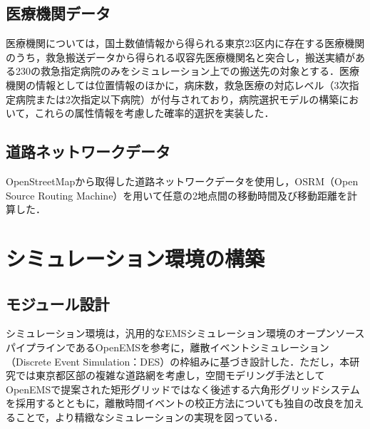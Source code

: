 \subsection{医療機関データ}
医療機関については，国土数値情報\cite{medical}から得られる東京23区内に存在する医療機関のうち，救急搬送データから得られる収容先医療機関名と突合し，搬送実績がある230の救急指定病院のみをシミュレーション上での搬送先の対象とする．医療機関の情報としては位置情報のほかに，病床数，救急医療の対応レベル（3次指定病院または2次指定以下病院）が付与されており，病院選択モデルの構築において，これらの属性情報を考慮した確率的選択を実装した．

\subsection{道路ネットワークデータ}
OpenStreetMap\cite{OSM}から取得した道路ネットワークデータを使用し，OSRM（Open Source Routing Machine）\cite{OSRM}を用いて任意の2地点間の移動時間及び移動距離を計算した．
\clearpage

\section{シミュレーション環境の構築}

\subsection{モジュール設計}
シミュレーション環境は，汎用的なEMSシミュレーション環境のオープンソースパイプラインであるOpenEMS\cite{ong2022}を参考に，離散イベントシミュレーション（Discrete Event Simulation：DES）の枠組みに基づき設計した．ただし，本研究では東京都区部の複雑な道路網を考慮し，空間モデリング手法としてOpenEMSで提案された矩形グリッドではなく後述する六角形グリッドシステムを採用するとともに，離散時間イベントの校正方法についても独自の改良を加えることで，より精緻なシミュレーションの実現を図っている．

